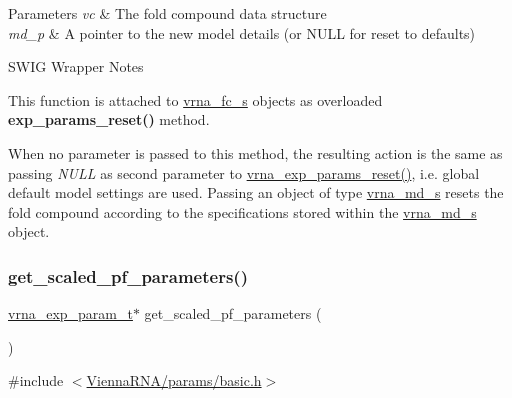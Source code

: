 \begin{DoxyParams}{Parameters}
{\em vc} & The fold compound data structure \\
\hline
{\em md\+\_\+p} & A pointer to the new model details (or N\+U\+LL for reset to defaults)\\
\hline
\end{DoxyParams}
\begin{DoxyRefDesc}{S\+W\+I\+G Wrapper Notes}
\item[\mbox{\hyperlink{wrappers__wrappers000097}{S\+W\+I\+G Wrapper Notes}}]This function is attached to \mbox{\hyperlink{group__fold__compound_structvrna__fc__s}{vrna\+\_\+fc\+\_\+s}} objects as overloaded {\bfseries{exp\+\_\+params\+\_\+reset()}} method.

When no parameter is passed to this method, the resulting action is the same as passing {\itshape N\+U\+LL} as second parameter to \mbox{\hyperlink{group__energy__parameters_gaa5409218068be84d7b50c78fbdaa85a9}{vrna\+\_\+exp\+\_\+params\+\_\+reset()}}, i.\+e. global default model settings are used. Passing an object of type \mbox{\hyperlink{group__model__details_structvrna__md__s}{vrna\+\_\+md\+\_\+s}} resets the fold compound according to the specifications stored within the \mbox{\hyperlink{group__model__details_structvrna__md__s}{vrna\+\_\+md\+\_\+s}} object. \end{DoxyRefDesc}
\mbox{\label{group__energy__parameters_gabf3b9271c41dd3fac02d56e0b02b3344}} 
\subsubsection{\texorpdfstring{get\_scaled\_pf\_parameters()}{get\_scaled\_pf\_parameters()}}
{\footnotesize\ttfamily \mbox{\hyperlink{group__energy__parameters_ga01d8b92fe734df8d79a6169482c7d8d8}{vrna\+\_\+exp\+\_\+param\+\_\+t}}$\ast$ get\+\_\+scaled\+\_\+pf\+\_\+parameters (\begin{DoxyParamCaption}\item[{void}]{ }\end{DoxyParamCaption})}



{\ttfamily \#include $<$\mbox{\hyperlink{params_2basic_8h}{Vienna\+R\+N\+A/params/basic.\+h}}$>$}

